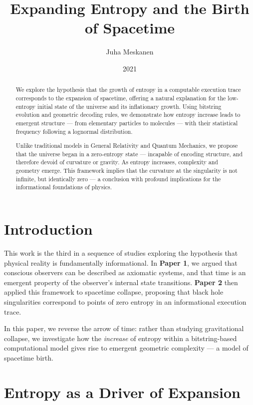 \documentclass[11pt]{article}
\title{Expanding Entropy and the Birth of Spacetime}
\author{Juha Meskanen}
\date{2021}
\begin{document}
\maketitle

\begin{abstract}
   We explore the hypothesis that the growth of entropy in a computable execution trace corresponds to the expansion of spacetime, offering a natural explanation for the low-entropy initial state of the universe and its inflationary growth. Using bitstring evolution and geometric decoding rules, we demonstrate how entropy increase leads to emergent structure — from elementary particles to molecules — with their statistical frequency following a lognormal distribution.

   Unlike traditional models in General Relativity and Quantum Mechanics, we propose that the universe began in a zero-entropy state — incapable of encoding structure, and therefore devoid of curvature or gravity. As entropy increases, complexity and geometry emerge. This framework implies that the curvature at the singularity is not infinite, but identically zero — a conclusion with profound implications for the informational foundations of physics.
\end{abstract}


\section{Introduction}

This work is the third in a sequence of studies exploring the hypothesis that physical reality is fundamentally informational. In \textbf{Paper 1}, we argued that conscious observers can be described as axiomatic systems, and that time is an emergent property of the observer’s internal state transitions. \textbf{Paper 2} then applied this framework to spacetime collapse, proposing that black hole singularities correspond to points of zero entropy in an informational execution trace.

In this paper, we reverse the arrow of time: rather than studying gravitational collapse, we investigate how the \textit{increase} of entropy within a bitstring-based computational model gives rise to emergent geometric complexity — a model of spacetime birth.


\section{Entropy as a Driver of Expansion}
\end{document}
